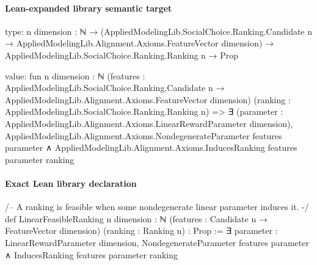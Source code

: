 \documentclass[10pt]{article}
\begin{document}
\paragraph{Lean-expanded library semantic target}
\begin{ReviewVerbatim}
type:
{n dimension : ℕ} →
  (AppliedModelingLib.SocialChoice.Ranking.Candidate n → AppliedModelingLib.Alignment.Axioms.FeatureVector dimension) →
    AppliedModelingLib.SocialChoice.Ranking.Ranking n → Prop

value:
fun {n dimension : ℕ}
    (features :
      AppliedModelingLib.SocialChoice.Ranking.Candidate n → AppliedModelingLib.Alignment.Axioms.FeatureVector dimension)
    (ranking : AppliedModelingLib.SocialChoice.Ranking.Ranking n) =>
  ∃ (parameter : AppliedModelingLib.Alignment.Axioms.LinearRewardParameter dimension),
    AppliedModelingLib.Alignment.Axioms.NondegenerateParameter features parameter ∧
      AppliedModelingLib.Alignment.Axioms.InducesRanking features parameter ranking
\end{ReviewVerbatim}

\paragraph{Exact Lean library declaration}
\begin{ReviewVerbatim}
/-- A ranking is feasible when some nondegenerate linear parameter induces it. -/
def LinearFeasibleRanking {n dimension : ℕ}
    (features : Candidate n → FeatureVector dimension) (ranking : Ranking n) : Prop :=
  ∃ parameter : LinearRewardParameter dimension,
    NondegenerateParameter features parameter ∧ InducesRanking features parameter ranking
\end{ReviewVerbatim}
\end{document}
